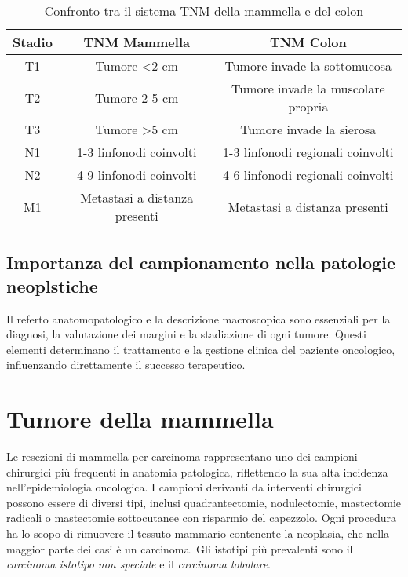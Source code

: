 \begin{table}[h!]
    \centering
    \begin{tabular}{|c|c|c|}
        \hline
        \textbf{Stadio} & \textbf{TNM Mammella} & \textbf{TNM Colon} \\
        \hline
        T1 & Tumore \textless 2 cm & Tumore invade la sottomucosa \\
        \hline
        T2 & Tumore 2-5 cm & Tumore invade la muscolare propria \\
        \hline
        T3 & Tumore \textgreater 5 cm & Tumore invade la sierosa \\
        \hline
        N1 & 1-3 linfonodi coinvolti & 1-3 linfonodi regionali coinvolti \\
        \hline
        N2 & 4-9 linfonodi coinvolti & 4-6 linfonodi regionali coinvolti \\
        \hline
        M1 & Metastasi a distanza presenti & Metastasi a distanza presenti \\
        \hline
    \end{tabular}
    \caption{Confronto tra il sistema TNM della mammella e del colon}
    \label{tab:tnm_comparativo}
\end{table}

\subsection{Importanza del campionamento nella patologie neoplstiche}
Il referto anatomopatologico e la descrizione macroscopica sono essenziali per la diagnosi, la valutazione dei margini e la stadiazione di ogni tumore. Questi elementi determinano il trattamento e la gestione clinica del paziente oncologico, influenzando direttamente il successo terapeutico.

\section{Tumore della mammella}
Le resezioni di mammella per carcinoma rappresentano uno dei campioni chirurgici più frequenti in anatomia patologica, riflettendo la sua alta incidenza nell'epidemiologia oncologica. I campioni derivanti da interventi chirurgici possono essere di diversi tipi, inclusi quadrantectomie, nodulectomie, mastectomie radicali o mastectomie sottocutanee con risparmio del capezzolo. Ogni procedura ha lo scopo di rimuovere il tessuto mammario contenente la neoplasia, che nella maggior parte dei casi è un carcinoma. Gli istotipi più prevalenti sono il \textit{carcinoma istotipo non speciale} e il \textit{carcinoma lobulare}.

